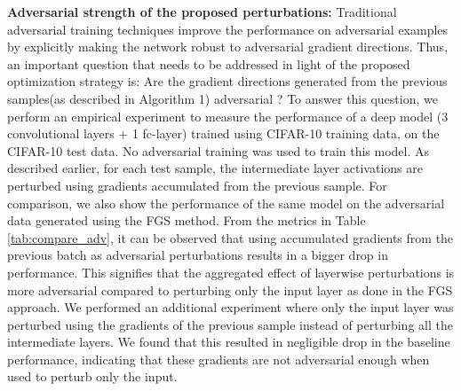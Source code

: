 \begin{table}
\centering
{}
\label{tab:compare_adv}
\vspace{-2mm}
\end{table}
\textbf{Adversarial strength of the proposed perturbations:} Traditional adversarial training techniques improve the performance on adversarial examples by explicitly making the network robust to adversarial gradient directions. Thus, an important question that needs to be addressed in light of the proposed optimization strategy is: Are the gradient directions generated from the previous samples(as described in Algorithm 1) adversarial ? To answer this question, we perform an empirical experiment to measure the performance of a deep model (3 convolutional layers + 1 fc-layer) trained using CIFAR-10 training data, on the CIFAR-10 test data. No adversarial training was used to train this model. As described earlier, for each test sample, the intermediate layer activations are perturbed using gradients accumulated from the previous sample. For comparison, we also show the performance of the same model on the adversarial data generated using the FGS method. From the metrics in Table \ref{tab:compare_adv}, it can be observed that using accumulated gradients from the previous batch as adversarial perturbations results in a bigger drop in performance. This signifies that the aggregated effect of layerwise perturbations is more adversarial compared to perturbing only the input layer as done in the FGS approach. We performed an additional experiment where only the input layer was perturbed using the gradients of the previous sample instead of perturbing all the intermediate layers. We found that this resulted in negligible drop in the baseline performance, indicating that these gradients are not adversarial enough when used to perturb only the input. 


